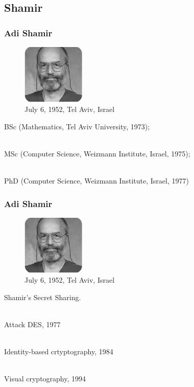\documentclass[slidestop,compress,mathserif]{beamer}
\begin{document}
\subsection{\hfill Shamir}

\begin{frame}
  \frametitle{Adi Shamir}
  \begin{multicols}{2}
    \begin{minipage}[c]{0.5\textwidth}
      \begin{figure}[H]
        \includegraphics[width=3cm]{s.png}
        \caption{July 6, 1952, Tel Aviv, Israel}
      \end{figure}
    \end{minipage}

    BSc (Mathematics, Tel Aviv University, 1973); 
   
    ~\\ 
    
    MSc (Computer Science, Weizmann Institute, Israel, 1975); 
    
    ~\\

    PhD (Computer Science, Weizmann Institute, Israel, 1977)    
  \end{multicols}
  
\end{frame}
\begin{frame}
  \frametitle{Adi Shamir}
  \begin{multicols}{2}
    \begin{minipage}[c]{0.5\textwidth}
      \begin{figure}[H]
        \includegraphics[width=3cm]{s.png}
        \caption{July 6, 1952, Tel Aviv, Israel}
      \end{figure}
    \end{minipage}

     \footnotesize

    Shamir's Secret Sharing.

    ~\\

    Attack DES, 1977

    ~\\

    Identity-based crtyptography, 1984

    ~\\

    Visual cryptography, 1994

  \end{multicols}
  
\end{frame}
\end{document}
